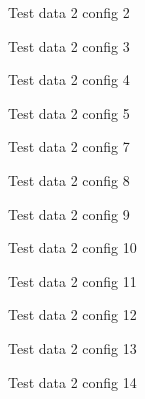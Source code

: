 \documentclass[conference]{IEEEtran}
\begin{document}
\begin{figure}[H]
    \centering
    
    \caption{Test data 2 config 2}
    \label{fig:td2_config2}
\end{figure}
\begin{figure}[H]
    \centering
    
    \caption{Test data 2 config 3}
    \label{fig:td2_config3}
\end{figure}
\begin{figure}[H]
    \centering
    
    \caption{Test data 2 config 4}
    \label{fig:td2_config4}
\end{figure}
\begin{figure}[H]
    \centering
    
    \caption{Test data 2 config 5}
    \label{fig:td2_config5}
\end{figure}

\begin{figure}[H]
    \centering
    
    \caption{Test data 2 config 7}
    \label{fig:td2_config7}
\end{figure}
\begin{figure}[H]
    \centering
    
    \caption{Test data 2 config 8}
    \label{fig:td2_config8}
\end{figure}
\begin{figure}[H]
    \centering
    
    \caption{Test data 2 config 9}
    \label{fig:td2_config9}
\end{figure}
\begin{figure}[H]
    \centering
    
    \caption{Test data 2 config 10}
    \label{fig:td2_config10}
\end{figure}
\begin{figure}[H]
    \centering
    
    \caption{Test data 2 config 11}
    \label{fig:td2_config11}
\end{figure}
\begin{figure}[H]
    \centering
    
    \caption{Test data 2 config 12}
    \label{fig:td2_config12}
\end{figure}
\begin{figure}[H]
    \centering
    
    \caption{Test data 2 config 13}
    \label{fig:td2_config13}
\end{figure}
\begin{figure}[H]
    \centering
    
    \caption{Test data 2 config 14}
    \label{fig:td2_config14}
\end{figure}
\end{document}
